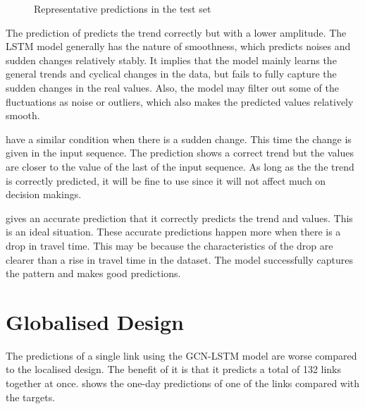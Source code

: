 \begin{figure}[!htb]
    \centering
    
    \caption{Representative predictions in the test set}
    \label{Figure:predict}
\end{figure}

The prediction of  predicts the trend correctly but with a lower amplitude. 
The LSTM model generally has the nature of smoothness, which predicts noises and sudden changes relatively stably. 
It implies that the model mainly learns the general trends and cyclical changes in the data, but fails to fully capture the sudden changes in the real values. 
Also, the model may filter out some of the fluctuations as noise or outliers, which also makes the predicted values relatively smooth. 

 have a similar condition when there is a sudden change. This time the change is given in the input sequence. 
The prediction shows a correct trend but the values are closer to the value of the last of the input sequence. 
As long as the the trend is correctly predicted, it will be fine to use since it will not affect much on decision makings. 

 gives an accurate prediction that it correctly predicts the trend and values. 
This is an ideal situation. These accurate predictions happen more when there is a drop in travel time. 
This may be because the characteristics of the drop are clearer than a rise in travel time in the dataset. The model successfully captures the pattern and makes good predictions. 

\section{Globalised Design}

The predictions of a single link using the GCN-LSTM model are worse compared to the localised design. 
The benefit of it is that it predicts a total of 132 links together at once. 
 shows the one-day predictions of one of the links compared with the targets.


